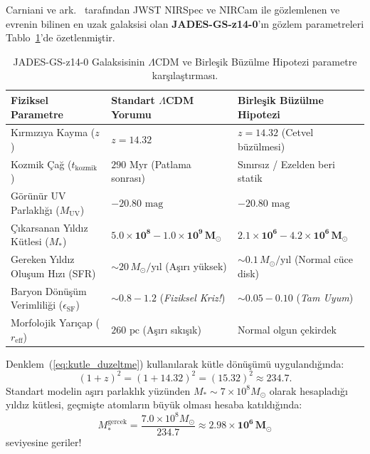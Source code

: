 \documentclass[11pt,a4paper]{article}
\begin{document}
Carniani ve ark.~\cite{carniani2024} tarafından JWST NIRSpec ve NIRCam ile gözlemlenen ve evrenin bilinen en uzak galaksisi olan \textbf{JADES-GS-z14-0}'ın gözlem parametreleri Tablo~\ref{tab:jades_kiyas}'de özetlenmiştir.

\begin{table}[h!]
    \centering
    \small
    \begin{tabular}{@{}lll@{}}
        \toprule
        \textbf{Fiziksel Parametre}                           & \textbf{Standart $\Lambda$CDM Yorumu}                  & \textbf{Birleşik Büzülme Hipotezi}                     \\ \midrule
        Kırmızıya Kayma ($z$)                                 & $z = 14.32$                                            & $z = 14.32$ (Cetvel büzülmesi)                         \\
        Kozmik Çağ ($t_{\mathrm{kozmik}}$)                    & $290\text{ Myr}$ (Patlama sonrası)                     & Sınırsız / Ezelden beri statik                         \\
        Görünür UV Parlaklığı ($M_{\mathrm{UV}}$)             & $-20.80\text{ mag}$                                    & $-20.80\text{ mag}$                                    \\
        Çıkarsanan Yıldız Kütlesi ($M_*$)                     & $\mathbf{5.0 \times 10^8 - 1.0 \times 10^9\, M_\odot}$ & $\mathbf{2.1 \times 10^6 - 4.2 \times 10^6\, M_\odot}$ \\
        Gereken Yıldız Oluşum Hızı (SFR)                      & $\sim 20\, M_\odot/\text{yıl}$ (Aşırı yüksek)          & $\sim 0.1\, M_\odot/\text{yıl}$ (Normal cüce disk)     \\
        Baryon Dönüşüm Verimliliği ($\epsilon_{\mathrm{SF}}$) & $\mathbf{\sim 0.8 - 1.2}$ (\textit{Fiziksel Kriz!})    & $\mathbf{\sim 0.05 - 0.10}$ (\textit{Tam Uyum})        \\
        Morfolojik Yarıçap ($r_{\mathrm{eff}}$)               & $260\text{ pc}$ (Aşırı sıkışık)                        & Normal olgun çekirdek                                  \\ \bottomrule
    \end{tabular}
    \caption{JADES-GS-z14-0 Galaksisinin $\Lambda$CDM ve Birleşik Büzülme Hipotezi parametre karşılaştırması.}
    \label{tab:jades_kiyas}
\end{table}

Denklem~(\ref{eq:kutle_duzeltme}) kullanılarak kütle dönüşümü uygulandığında:
\begin{equation}
    (1 + z)^2 = (1 + 14.32)^2 = (15.32)^2 \approx \mathbf{234.7}.
\end{equation}
Standart modelin aşırı parlaklık yüzünden $M_* \sim 7 \times 10^8 M_\odot$ olarak hesapladığı yıldız kütlesi, geçmişte atomların büyük olması hesaba katıldığında:
\begin{equation}
    M_*^{\mathrm{gercek}} = \frac{7.0 \times 10^8 M_\odot}{234.7} \approx \mathbf{2.98 \times 10^6 \, M_\odot}
\end{equation}
seviyesine geriler!
\end{document}
